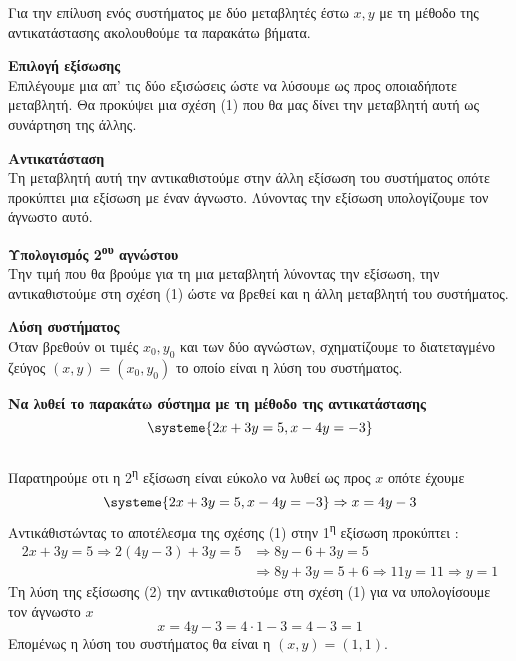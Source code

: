 \documentclass[twoside,nofonts,internet,methodoi]{thewria}
\newcommand{\tss}[1]{\textsuperscript{#1}}
\begin{document}
\begin{Methodos}
Για την επίλυση ενός συστήματος με δύο μεταβλητές έστω $ x,y $ με τη μέθοδο της αντικατάστασης ακολουθούμε τα παρακάτω βήματα.
\begin{bhma}
\item \textbf{Επιλογή εξίσωσης}\\
Επιλέγουμε μια απ' τις δύο εξισώσεις ώστε να λύσουμε ως προς οποιαδήποτε μεταβλητή. Θα προκύψει μια σχέση (1) που θα μας δίνει την μεταβλητή αυτή ως συνάρτηση της άλλης. 
\item \textbf{Αντικατάσταση}\\
Τη μεταβλητή αυτή την αντικαθιστούμε στην άλλη εξίσωση του συστήματος οπότε προκύπτει μια εξίσωση με έναν άγνωστο. Λύνοντας την εξίσωση υπολογίζουμε τον άγνωστο αυτό.
\item \textbf{Υπολογισμός 2\tss{ου} αγνώστου}\\
Την τιμή που θα βρούμε για τη μια μεταβλητή λύνοντας την εξίσωση, την αντικαθιστούμε στη σχέση (1) ώστε να βρεθεί και η άλλη μεταβλητή του συστήματος.
\item \textbf{Λύση συστήματος}\\
Όταν βρεθούν οι τιμές $ x_0,y_0 $ και των δύο αγνώστων, σχηματίζουμε το διατεταγμένο ζεύγος $ (x,y)=(x_0,y_0) $ το οποίο είναι η λύση του συστήματος.
\end{bhma}
\end{Methodos}
\textbf{Να λυθεί το παρακάτω σύστημα με τη μέθοδο της αντικατάστασης}
{\boldmath\[ \systeme{2x+3y=5,x-4y=-3} \]}
\lysh\\
Παρατηρούμε οτι η 2\tss{η} εξίσωση είναι εύκολο να λυθεί ως προς $ x $ οπότε έχουμε
\begin{equation}
\systeme{2x+3y=5,x-4y=-3}\Rightarrow x=4y-3
\end{equation}
Αντικάθιστώντας το αποτέλεσμα της σχέσης (1) στην 1\tss{η} εξίσωση προκύπτει :
\begin{equation}\begin{aligned}
2x+3y=5\Rightarrow 2(4y-3)+3y=5&\Rightarrow 8y-6+3y=5\\&\Rightarrow 8y+3y=5+6\Rightarrow 11y=11\Rightarrow y=1\end{aligned}
\end{equation}
Τη λύση της εξίσωσης (2) την αντικαθιστούμε στη σχέση (1) για να υπολογίσουμε τον άγνωστο $ x $
\[ x=4y-3=4\cdot1-3=4-3=1 \]
Επομένως η λύση του συστήματος θα είναι η $ (x,y)=(1,1) $.
\end{document}
